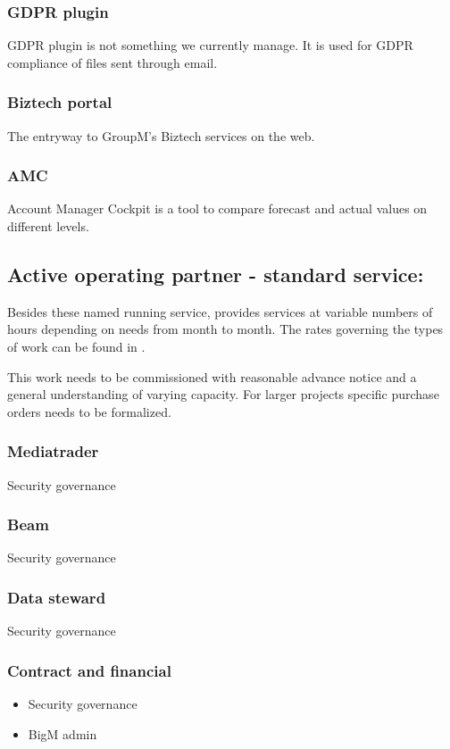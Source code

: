\subsubsection{GDPR plugin}
GDPR plugin is not something we currently manage. It is used for GDPR compliance of files sent through email.

\subsubsection{Biztech portal}
The entryway to GroupM's Biztech services on the web.

\subsubsection{AMC}
Account Manager Cockpit is a tool to compare forecast and actual values on different levels.

\subsection{Active operating partner - standard service:}
Besides these named running service, \suppliername provides services at variable numbers of hours depending on \customername needs from month to month. The rates governing the types of work can be found in .

This work needs to be commissioned with reasonable advance notice and a general understanding of varying capacity. For larger projects specific purchase orders needs to be formalized.

\subsubsection{Mediatrader}
Security governance

\subsubsection{Beam}
Security governance

\subsubsection{Data steward}
Security governance

\subsubsection{Contract and financial}
\begin{itemize}
\item Security governance
\item BigM admin
\end{itemize}

